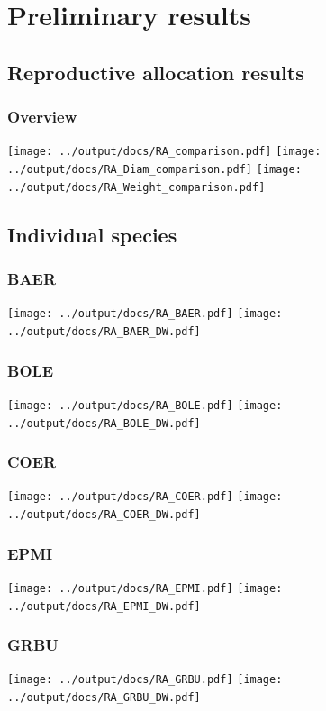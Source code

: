 \documentclass[10pt]{book} %
\begin{document}
\chapter{Preliminary results}
\section{Reproductive allocation results}
\subsection{Overview}
\texttt{[image: ../output/docs/RA\_comparison.pdf]}
\texttt{[image: ../output/docs/RA\_Diam\_comparison.pdf]}
\texttt{[image: ../output/docs/RA\_Weight\_comparison.pdf]}
\clearpage
\newpage
\section{Individual species}
\subsection{BAER}
\texttt{[image: ../output/docs/RA\_BAER.pdf]}
{\center\texttt{[image: ../output/docs/RA\_BAER\_DW.pdf]}}

\clearpage
\newpage
\subsection{BOLE}
\texttt{[image: ../output/docs/RA\_BOLE.pdf]}
{\center\texttt{[image: ../output/docs/RA\_BOLE\_DW.pdf]}}

\clearpage
\newpage
\subsection{COER}
\texttt{[image: ../output/docs/RA\_COER.pdf]}
{\center\texttt{[image: ../output/docs/RA\_COER\_DW.pdf]}}

\clearpage
\newpage
\subsection{EPMI}
\texttt{[image: ../output/docs/RA\_EPMI.pdf]}
{\center\texttt{[image: ../output/docs/RA\_EPMI\_DW.pdf]}}

\clearpage
\newpage
\subsection{GRBU}
\texttt{[image: ../output/docs/RA\_GRBU.pdf]}
{\center\texttt{[image: ../output/docs/RA\_GRBU\_DW.pdf]}}
\end{document}
